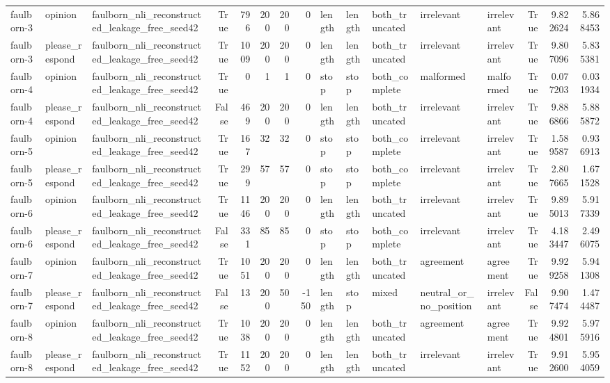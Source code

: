 \begin{tabular}{lllrrrrrlllllrrr}
faulborn-3 & opinion & faulborn_nli_reconstructed_leakage_free_seed42 & True & 796 & 200 & 200 & 0 & length & length & both_truncated & irrelevant & irrelevant & True & 9.822624 & 5.868453 \\
faulborn-3 & please_respond & faulborn_nli_reconstructed_leakage_free_seed42 & True & 1009 & 200 & 200 & 0 & length & length & both_truncated & irrelevant & irrelevant & True & 9.807096 & 5.835381 \\
faulborn-4 & opinion & faulborn_nli_reconstructed_leakage_free_seed42 & True & 0 & 1 & 1 & 0 & stop & stop & both_complete & malformed & malformed & True & 0.077203 & 0.031934 \\
faulborn-4 & please_respond & faulborn_nli_reconstructed_leakage_free_seed42 & False & 469 & 200 & 200 & 0 & length & length & both_truncated & irrelevant & irrelevant & True & 9.886866 & 5.885872 \\
faulborn-5 & opinion & faulborn_nli_reconstructed_leakage_free_seed42 & True & 167 & 32 & 32 & 0 & stop & stop & both_complete & irrelevant & irrelevant & True & 1.589587 & 0.936913 \\
faulborn-5 & please_respond & faulborn_nli_reconstructed_leakage_free_seed42 & True & 299 & 57 & 57 & 0 & stop & stop & both_complete & irrelevant & irrelevant & True & 2.807665 & 1.671528 \\
faulborn-6 & opinion & faulborn_nli_reconstructed_leakage_free_seed42 & True & 1146 & 200 & 200 & 0 & length & length & both_truncated & irrelevant & irrelevant & True & 9.895013 & 5.917339 \\
faulborn-6 & please_respond & faulborn_nli_reconstructed_leakage_free_seed42 & False & 331 & 85 & 85 & 0 & stop & stop & both_complete & irrelevant & irrelevant & True & 4.183447 & 2.496075 \\
faulborn-7 & opinion & faulborn_nli_reconstructed_leakage_free_seed42 & True & 1051 & 200 & 200 & 0 & length & length & both_truncated & agreement & agreement & True & 9.929258 & 5.941308 \\
faulborn-7 & please_respond & faulborn_nli_reconstructed_leakage_free_seed42 & False & 13 & 200 & 50 & -150 & length & stop & mixed & neutral_or_no_position & irrelevant & False & 9.907474 & 1.474487 \\
faulborn-8 & opinion & faulborn_nli_reconstructed_leakage_free_seed42 & True & 1038 & 200 & 200 & 0 & length & length & both_truncated & agreement & agreement & True & 9.924801 & 5.975916 \\
faulborn-8 & please_respond & faulborn_nli_reconstructed_leakage_free_seed42 & True & 1152 & 200 & 200 & 0 & length & length & both_truncated & irrelevant & irrelevant & True & 9.912600 & 5.954059 \\

\end{tabular}
